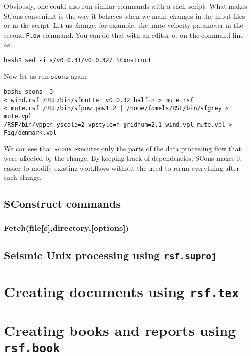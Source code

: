 Obviously, one could also run similar commands with a shell script. What makes SCons convenient is the way it behaves when we make changes in the input files or in the script. Let us change, for example, the mute velocity parameter in the second \texttt{Flow} command. You can do that with an editor or on the command line as

\begin{verbatim}
bash$ sed -i s/v0=0.31/v0=0.32/ SConstruct
\end{verbatim}

Now let us run \texttt{scons} again

\begin{verbatim}
bash$ scons -Q
< wind.rsf /RSF/bin/sfmutter v0=0.32 half=n > mute.rsf
< mute.rsf /RSF/bin/sfpow pow1=2 | /home/fomels/RSF/bin/sfgrey > mute.vpl
/RSF/bin/vppen yscale=2 vpstyle=n gridnum=2,1 wind.vpl mute.vpl > Fig/denmark.vpl
\end{verbatim}

We can see that \texttt{scons} executes only the parts of the data
processing flow that were affected by the change. By keeping track of
dependencies, SCons makes it easier to modify existing workflows
without the need to rerun everything after each change.

\subsection{SConstruct commands}

\subsubsection{Fetch(file[s],directory,[options])}

\subsection{Seismic Unix processing using  \texttt{rsf.suproj}}

\section{Creating documents using \texttt{rsf.tex}}

\section{Creating books and reports using \texttt{rsf.book}}



